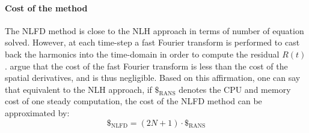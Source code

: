 \paragraph{Cost of the method}
The NLFD method is close to the NLH approach in terms of number
of equation solved. However, at each time-step a fast Fourier transform
is performed to cast back the harmonics into the time-domain in order
to compute the residual $R(t)$. \citet{McMullen2006} argue
that the cost of the fast Fourier transform is less than the cost of 
the spatial derivatives, and is thus negligible.
Based on this affirmation, one can say that equivalent to the NLH
approach, if $\mathdollar_{\text{RANS}}$ 
denotes the CPU and memory cost of
one steady computation, the cost of the NLFD method can be 
approximated by:
\begin{equation}
	\mathdollar_{\text{NLFD}} = (2N+1) \cdot \mathdollar_{\text{RANS}}
\end{equation}